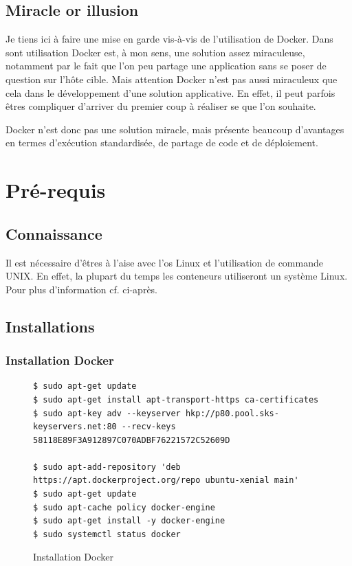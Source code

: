 \subsection{Miracle or illusion}
Je tiens ici à faire une mise en garde vis-à-vis de l'utilisation de Docker. Dans sont utilisation Docker est, à mon sens, une solution assez miraculeuse, notamment par le fait que l'on peu partage une application sans se poser de question sur l'hôte cible. Mais attention Docker n'est pas aussi miraculeux que cela dans le développement d'une solution applicative. En effet, il peut parfois êtres compliquer d'arriver du premier coup à réaliser se que l'on souhaite.

Docker n'est donc pas une solution miracle, mais présente beaucoup d'avantages en termes d'exécution standardisée, de partage de code et de déploiement.

\section{Pré-requis}
\subsection{Connaissance}
Il est nécessaire d'êtres à l’aise avec l'\gls{os} Linux et l'utilisation de commande UNIX. En effet, la plupart du temps les conteneurs utiliseront un système Linux. Pour plus d'information cf. ci-après.


\subsection{Installations}
\lstset{language=bash}

\subsubsection{Installation Docker}
\begin{figure}[H] 
\centering 
\begin{lstlisting}[frame=single]
$ sudo apt-get update
$ sudo apt-get install apt-transport-https ca-certificates
$ sudo apt-key adv --keyserver hkp://p80.pool.sks-keyservers.net:80 --recv-keys 58118E89F3A912897C070ADBF76221572C52609D

$ sudo apt-add-repository 'deb https://apt.dockerproject.org/repo ubuntu-xenial main'
$ sudo apt-get update
$ sudo apt-cache policy docker-engine
$ sudo apt-get install -y docker-engine
$ sudo systemctl status docker
\end{lstlisting}
\caption[Code - Installation Docker]{Installation Docker}
\label{fig:installDocker} 
\end{figure}

